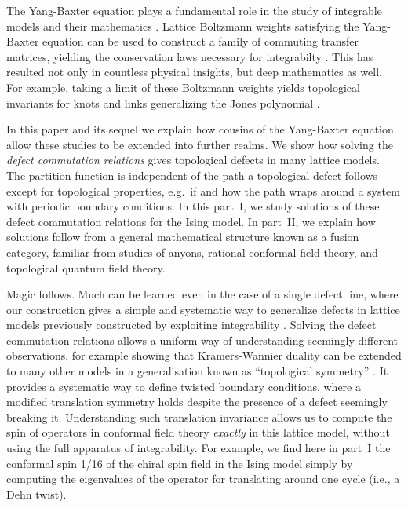 \documentclass[11pt]{article}
\numberwithin{equation}{section}		%
\begin{document}
\label{sec:Intro}

The Yang-Baxter equation plays a fundamental role in the study of integrable models and their mathematics \cite{Perk2006}. Lattice Boltzmann weights satisfying the Yang-Baxter equation can be used to construct a family of commuting transfer matrices, yielding the conservation laws necessary for integrabilty \cite{Baxter1982}.
This has resulted not only in countless physical insights, but deep mathematics as well. For example, taking a limit of these Boltzmann weights yields topological invariants for knots and links generalizing the Jones polynomial \cite{Wadati1989}. 

In this paper and its sequel we explain how cousins of the Yang-Baxter equation allow these studies to be extended into further realms. We show how solving the {\em defect commutation relations} gives
topological defects in many lattice models. The partition function is independent of the path a topological defect follows except for topological properties, e.g.\ if and how the path wraps around a system with periodic boundary conditions. 
In this part~I, we study solutions of these defect commutation relations for the Ising model. In part~II, we explain how solutions follow from a general mathematical structure known as a fusion category, familiar from studies of anyons, rational conformal field theory, and topological quantum field theory. 

Magic follows. Much can be learned even in the case of a single defect line, where our construction gives a simple and systematic way to generalize defects in lattice models previously constructed by exploiting integrability \cite{Pearce2001,Pearce2003}. Solving the defect commutation relations allows a uniform way of understanding seemingly different observations, for example showing that Kramers-Wannier duality \cite{Kramers1941} can be extended to many other models in a generalisation known as ``topological symmetry'' \cite{Feiguin2007}. 
It provides a systematic way to define twisted boundary conditions, where a modified translation symmetry holds despite the presence of a defect seemingly breaking it. Understanding such translation invariance allows us 
to compute the spin of operators in conformal field theory  {\em exactly} in this lattice model, without using the full apparatus of integrability. For example, we find here in part~I the conformal spin 1/16 of the chiral spin field in the Ising model simply by computing the eigenvalues of the operator for translating around one cycle (i.e., a Dehn twist). %
\end{document}
